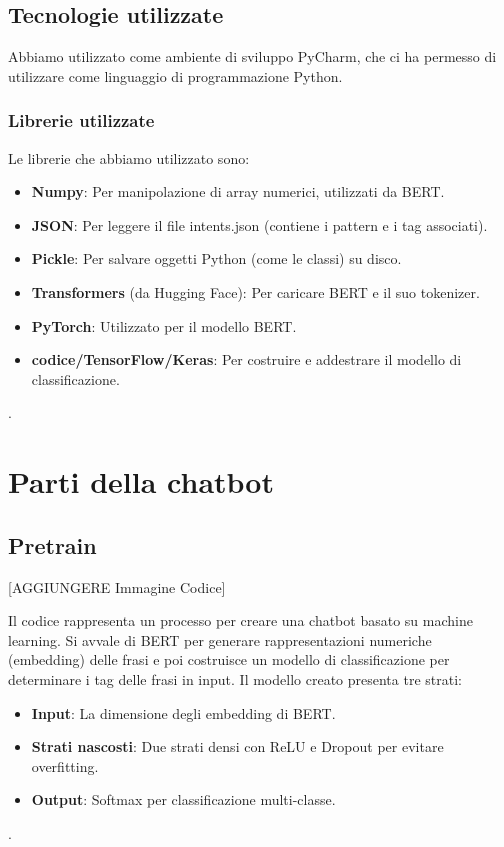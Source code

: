 \documentclass[12pt, letterpaper]{article}
\begin{document}
\subsection{Tecnologie utilizzate}
Abbiamo utilizzato come ambiente di sviluppo PyCharm, che ci ha permesso di utilizzare come linguaggio di programmazione Python. 

\subsubsection{Librerie utilizzate}
Le librerie che abbiamo utilizzato sono:
\begin{itemize}
	\item \textbf{Numpy}: Per manipolazione di array numerici, utilizzati da BERT.
	
	\item \textbf{JSON}: Per leggere il file intents.json (contiene i pattern e i tag associati).
	
	\item \textbf{Pickle}: Per salvare oggetti Python (come le classi) su disco.
	
	\item \textbf{Transformers} (da Hugging Face): Per caricare BERT e il suo tokenizer.
	
	\item \textbf{PyTorch}: Utilizzato per il modello BERT.
	
	\item \textbf{codice/TensorFlow/Keras}: Per costruire e addestrare il modello di classificazione.
	
\end{itemize}.

\section{Parti della chatbot}
\subsection{Pretrain}
[AGGIUNGERE Immagine Codice]


Il codice rappresenta un processo per creare una chatbot basato su machine learning. Si avvale di BERT per generare rappresentazioni numeriche (embedding) delle frasi e poi costruisce un modello di classificazione per determinare i tag delle frasi in input. 
Il modello creato presenta tre strati: 
\begin{itemize}
\item \textbf{Input}:  La dimensione degli embedding di BERT.
\item \textbf{Strati nascosti}: Due strati densi con ReLU e Dropout per evitare overfitting.
\item \textbf{Output}: Softmax per classificazione multi-classe.
\end{itemize}.
\end{document}
